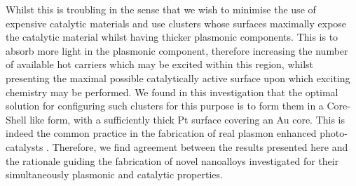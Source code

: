 Whilst this is troubling in the sense that we wish to minimise the use of expensive catalytic materials and use clusters whose surfaces maximally expose the catalytic material whilst having thicker plasmonic components. This is to absorb more light in the plasmonic component, therefore increasing the number of available hot carriers which may be excited within this region, whilst presenting the maximal possible catalytically active surface upon which exciting chemistry may be performed. We found in this investigation that the optimal solution for configuring such clusters for this purpose is to form them in a Core-Shell like form, with a sufficiently thick Pt surface covering an Au core. This is indeed the common practice in the fabrication of real plasmon enhanced photo-catalysts \cite{JorgeStructure,Jorge2019,Jorge2021}. Therefore, we find agreement between the results presented here and the rationale guiding the fabrication of novel nanoalloys investigated for their simultaneously plasmonic and catalytic properties.